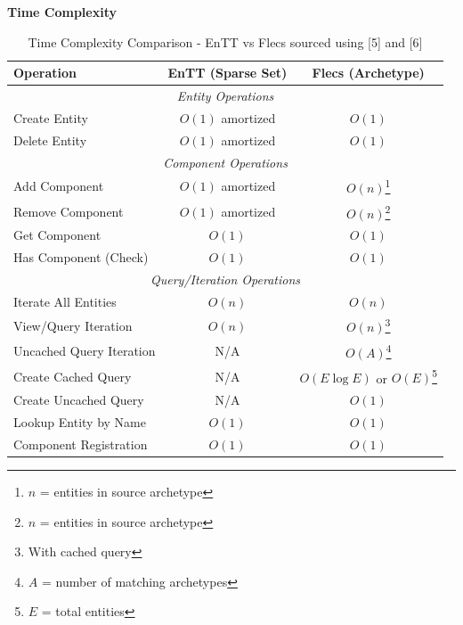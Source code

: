 \documentclass[]{final_report}
\begin{document}
\textbf{Time Complexity} \newline
\begin{table}[!h]
	\centering
	\begin{tabular}{|l|c|c|}
		\hline
		\textbf{Operation} & \textbf{EnTT (Sparse Set)} & \textbf{Flecs (Archetype)} \\
		\hline
		\multicolumn{3}{|c|}{\textit{Entity Operations}} \\
		\hline
		Create Entity & $O(1)$ amortized & $O(1)$ \\
		\hline
		Delete Entity & $O(1)$ amortized & $O(1)$ \\
		\hline
		\multicolumn{3}{|c|}{\textit{Component Operations}} \\
		\hline
		Add Component & $O(1)$ amortized & $O(n)$\footnote{$n$ = entities in source archetype} \\
		\hline
		Remove Component & $O(1)$ amortized & $O(n)$\footnote{$n$ = entities in source archetype} \\
		\hline
		Get Component & $O(1)$ & $O(1)$ \\
		\hline
		Has Component (Check) & $O(1)$ & $O(1)$ \\
		\hline
		\multicolumn{3}{|c|}{\textit{Query/Iteration Operations}} \\
		\hline
		Iterate All Entities & $O(n)$ & $O(n)$ \\
		\hline
		View/Query Iteration & $O(n)$ & $O(n)$\footnote{With cached query} \\
		\hline
		Uncached Query Iteration & N/A & $O(A)$\footnote{$A$ = number of matching archetypes} \\
		\hline
		Create Cached Query & N/A & $O(E \log E)$ or $O(E)$\footnote{$E$ = total entities} \\
		\hline
		Create Uncached Query & N/A & $O(1)$ \\
		\hline
		Lookup Entity by Name & $O(1)$ & $O(1)$ \\
		\hline
		Component Registration & $O(1)$ & $O(1)$ \\
		\hline
	\end{tabular}
	\caption{Time Complexity Comparison - EnTT vs Flecs sourced using [5] and [6]}
\end{table}
\end{document}
